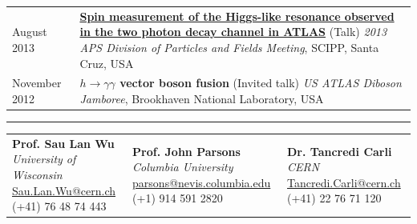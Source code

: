 \documentclass{letter}
\begin{document}
\begin{tabular}{p{}p{}}
\\
	August 2013
	&
	\href{https://indico.bnl.gov/contributionDisplay.py?contribId=155&sessionId=9&confId=603}{\textbf{Spin measurement of the Higgs-like resonance observed in the two photon decay channel in ATLAS}} (Talk) \newline
	\textit{2013 APS Division of Particles and Fields Meeting}, SCIPP, Santa Cruz, USA \newline
\\
	November 2012
	&
	\textbf{$h\rightarrow \gamma \gamma$ vector boson fusion} (Invited talk) \newline
	\textit{US ATLAS Diboson Jamboree}, Brookhaven National Laboratory, USA \newline
\end{tabular}
\vspace{-10pt}


\begin{flushleft}
\Large{\textsc{\textbf{\color{Maroon}{References}}}}
\hrule
\end{flushleft}

\begin{tabular}{p{}p{}p{}}
	\textbf{Prof. Sau Lan Wu} \newline
	\textit{University of Wisconsin} \newline
	\href{mailto:Sau.Lan.Wu@cern.ch}{Sau.Lan.Wu@cern.ch} \newline
	(+41) 76 48 74 443
	&
	\textbf{Prof. John Parsons} \newline
	\textit{Columbia University} \newline
	\href{mailto:parsons@nevis.columbia.edu}{parsons@nevis.columbia.edu} \newline
	(+1) 914 591 2820
	&
	\textbf{Dr. Tancredi Carli} \newline
	\textit{CERN} \newline
	\href{mailto:Tancredi.Carli@cern.ch}{Tancredi.Carli@cern.ch} \newline
	(+41) 22 76 71 120
\end{tabular}
\end{document}
